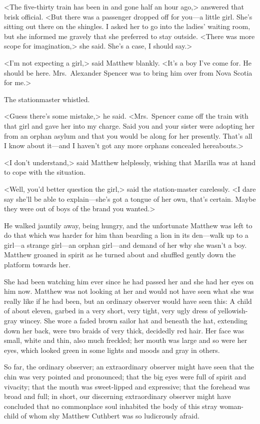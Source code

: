<The five-thirty train has been in and gone half an hour ago,> answered that brisk official. <But there was a passenger dropped off for you—a little girl. She's sitting out there on the shingles. I asked her to go into the ladies' waiting room, but she informed me gravely that she preferred to stay outside. <There was more scope for imagination,> she said. She's a case, I should say.>

<I'm not expecting a girl,> said Matthew blankly. <It's a boy I've come for. He should be here. Mrs.~Alexander Spencer was to bring him over from Nova Scotia for me.>

The stationmaster whistled.

<Guess there's some mistake,> he said. <Mrs.~Spencer came off the train with that girl and gave her into my charge. Said you and your sister were adopting her from an orphan asylum and that you would be along for her presently. That's all I know about it—and I haven't got any more orphans concealed hereabouts.>

<I don't understand,> said Matthew helplessly, wishing that Marilla was at hand to cope with the situation.

<Well, you'd better question the girl,> said the station-master carelessly. <I dare say she'll be able to explain—she's got a tongue of her own, that's certain. Maybe they were out of boys of the brand you wanted.>

He walked jauntily away, being hungry, and the unfortunate Matthew was left to do that which was harder for him than bearding a lion in its den—walk up to a girl—a strange girl—an orphan girl—and demand of her why she wasn't a boy. Matthew groaned in spirit as he turned about and shuffled gently down the platform towards her.

She had been watching him ever since he had passed her and she had her eyes on him now. Matthew was not looking at her and would not have seen what she was really like if he had been, but an ordinary observer would have seen this: A child of about eleven, garbed in a very short, very tight, very ugly dress of yellowish-gray wincey. She wore a faded brown sailor hat and beneath the hat, extending down her back, were two braids of very thick, decidedly red hair. Her face was small, white and thin, also much freckled; her mouth was large and so were her eyes, which looked green in some lights and moods and gray in others.

So far, the ordinary observer; an extraordinary observer might have seen that the chin was very pointed and pronounced; that the big eyes were full of spirit and vivacity; that the mouth was sweet-lipped and expressive; that the forehead was broad and full; in short, our discerning extraordinary observer might have concluded that no commonplace soul inhabited the body of this stray woman-child of whom shy Matthew Cuthbert was so ludicrously afraid.

